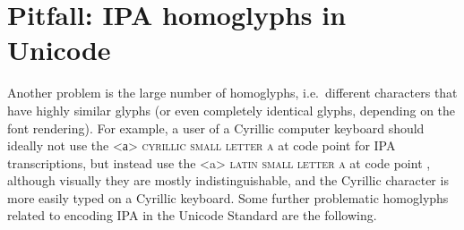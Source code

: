 \section{Pitfall: IPA homoglyphs in Unicode}
\label{pitfall-ipa-homoglyphs}

Another problem is the large number of homoglyphs, i.e.~different characters
that have highly similar glyphs (or even completely identical glyphs, depending
on the font rendering). For example, a user of a Cyrillic computer keyboard
should ideally not use the <а> \textsc{cyrillic small letter a} at code point
 for IPA transcriptions, but instead use the <a> \textsc{latin small
letter a} at code point , although visually they are mostly
indistinguishable, and the Cyrillic character is more easily typed on a Cyrillic
keyboard. Some further problematic homoglyphs related to encoding IPA in the
Unicode Standard are the following.

